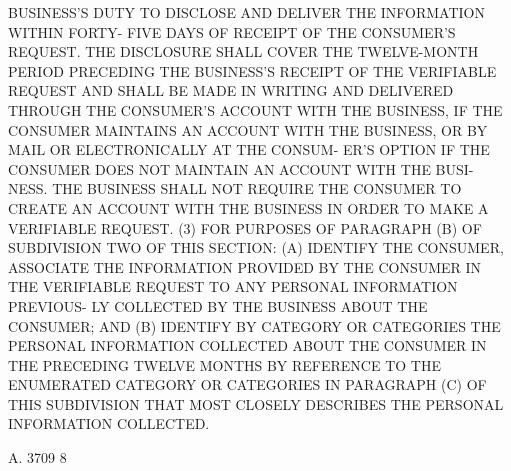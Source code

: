  BUSINESS'S DUTY TO DISCLOSE AND DELIVER THE  INFORMATION  WITHIN  FORTY-
 FIVE  DAYS  OF  RECEIPT  OF THE CONSUMER'S REQUEST. THE DISCLOSURE SHALL
 COVER THE TWELVE-MONTH PERIOD PRECEDING THE BUSINESS'S  RECEIPT  OF  THE
 VERIFIABLE  REQUEST  AND  SHALL BE MADE IN WRITING AND DELIVERED THROUGH
 THE CONSUMER'S ACCOUNT WITH THE BUSINESS, IF THE CONSUMER  MAINTAINS  AN
 ACCOUNT  WITH  THE BUSINESS, OR BY MAIL OR ELECTRONICALLY AT THE CONSUM-
 ER'S OPTION IF THE CONSUMER DOES NOT MAINTAIN AN ACCOUNT WITH THE  BUSI-
 NESS.  THE  BUSINESS SHALL NOT REQUIRE THE CONSUMER TO CREATE AN ACCOUNT
 WITH THE BUSINESS IN ORDER TO MAKE A VERIFIABLE REQUEST.
   (3) FOR PURPOSES OF PARAGRAPH (B) OF SUBDIVISION TWO OF THIS  SECTION:
 (A)  IDENTIFY  THE  CONSUMER,  ASSOCIATE THE INFORMATION PROVIDED BY THE
 CONSUMER IN THE VERIFIABLE REQUEST TO ANY PERSONAL INFORMATION PREVIOUS-
 LY COLLECTED BY THE BUSINESS ABOUT THE CONSUMER;  AND  (B)  IDENTIFY  BY
 CATEGORY  OR  CATEGORIES  THE  PERSONAL  INFORMATION COLLECTED ABOUT THE
 CONSUMER IN THE PRECEDING TWELVE MONTHS BY REFERENCE TO  THE  ENUMERATED
 CATEGORY  OR  CATEGORIES  IN PARAGRAPH (C) OF THIS SUBDIVISION THAT MOST
 CLOSELY DESCRIBES THE PERSONAL INFORMATION COLLECTED.

 A. 3709                             8
 
